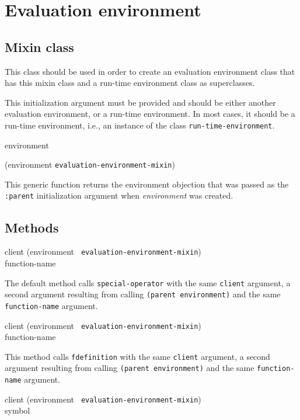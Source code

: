 \chapter{Evaluation environment}

\section{Mixin class}


This class should be used in order to create an evaluation environment
class that has this mixin class and a run-time environment class as
superclasses.


This initialization argument must be provided and should be either
another evaluation environment, or a run-time environment.  In most
cases, it should be a run-time environment, i.e., an instance of the
class \texttt{run-time-environment}.

 {environment}

 {(environment {\tt evaluation-environment-mixin})}

This generic function returns the environment objection that was passed
as the \texttt{:parent} initialization argument when
\textit{environment} was created.

\section{Methods}

{\small{} {client (environment {\tt
      evaluation-environment-mixin}) \\ function-name}
}

The default method calls \texttt{special-operator} with the same
\texttt{client} argument, a second argument resulting from calling
\texttt{(parent environment)} and the same \texttt{function-name} argument.

{\small{} {client (environment {\tt
      evaluation-environment-mixin}) \\ function-name}
}

This method calls \texttt{fdefinition} with the same \texttt{client} argument,
a second argument resulting from calling \texttt{(parent environment)} and the
same \texttt{function-name} argument.

{\small{} {client (environment {\tt
      evaluation-environment-mixin}) \\ symbol}
}


